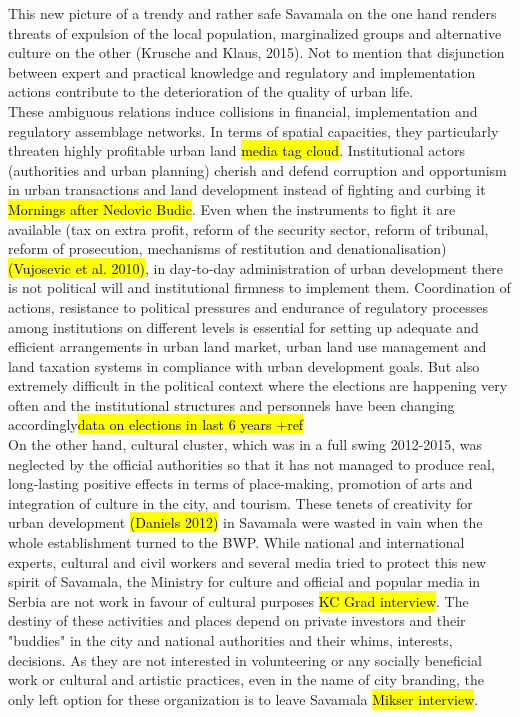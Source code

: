 \documentclass[11pt]{report}
\begin{document}
This new picture of a trendy and rather safe Savamala on the one hand renders threats of expulsion of the local population, marginalized groups and alternative culture on the other (Krusche and Klaus, 2015).
Not to mention that disjunction between expert and practical knowledge and regulatory and implementation actions contribute to the deterioration of the quality of urban life.
\\
These ambiguous relations induce collisions in financial, implementation and regulatory assemblage networks. In terms of spatial capacities, they particularly threaten highly profitable urban land \hl{media tag cloud}.
Institutional actors (authorities and urban planning) cherish and defend corruption and opportunism in urban transactions and land development instead of fighting and curbing it \hl{Mornings after Nedovic Budic}.
Even when the instruments to fight it are available (tax on extra profit, reform of the security sector, reform of tribunal, reform of prosecution, mechanisms of restitution and denationalisation) \hl{(Vujosevic et al. 2010)}, in day-to-day administration of urban
development there is not political will and institutional firmness to implement them.
Coordination of actions, resistance to political pressures and endurance of regulatory processes among institutions on different levels is essential for setting up adequate and efficient arrangements in urban land market, urban land use management and land taxation systems in compliance with urban development goals. But also extremely difficult in the political context where the elections are happening very often and the institutional structures and personnels have been changing accordingly\hl{data on elections in last 6 years +ref}
\\
On the other hand, cultural cluster, which was in a full swing 2012-2015, was neglected by the official authorities so that it has not managed to produce real, long-lasting positive effects in terms of place-making, promotion of arts and integration of culture in the city, and tourism. These tenets of creativity for urban development \hl{(Daniels 2012)} in Savamala were wasted in vain when the whole establishment turned to the BWP.
While national and international experts, cultural and civil workers and several media tried to protect this new spirit of Savamala, the Ministry for culture and official and popular media in Serbia are not work in favour of cultural purposes \hl{KC Grad interview}.
The destiny of these activities and places depend on private investors and their "buddies" in the city and national authorities and their whims, interests, decisions. As they are not interested in volunteering or any socially beneficial work or cultural and artistic practices, even in the name of city branding, the only left option for these organization is to leave Savamala \hl{Mikser interview}.
\end{document}
